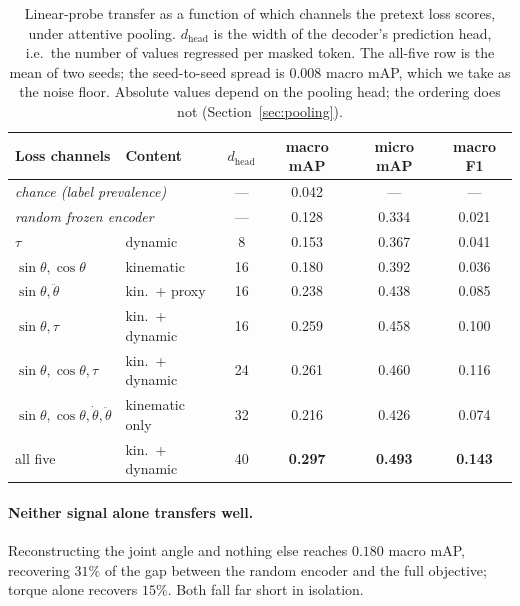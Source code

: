 \begin{table}[t]
\centering
\small
\begin{tabular}{llcccc}
\toprule
Loss channels & Content & $d_\text{head}$ & macro mAP & micro mAP & macro F1 \\
\midrule
\multicolumn{2}{l}{\emph{chance (label prevalence)}}   & --- & 0.042 & ---   & ---   \\
\multicolumn{2}{l}{\emph{random frozen encoder}}       & --- & 0.128 & 0.334 & 0.021 \\
\midrule
$\tau$                                        & dynamic          &  8 & 0.153 & 0.367 & 0.041 \\
$\sin\theta,\cos\theta$                       & kinematic        & 16 & 0.180 & 0.392 & 0.036 \\
$\sin\theta,\ddot\theta$                      & kin.\ + proxy    & 16 & 0.238 & 0.438 & 0.085 \\
$\sin\theta,\tau$                             & kin.\ + dynamic  & 16 & 0.259 & 0.458 & 0.100 \\
$\sin\theta,\cos\theta,\tau$                  & kin.\ + dynamic  & 24 & 0.261 & 0.460 & 0.116 \\
$\sin\theta,\cos\theta,\dot\theta,\ddot\theta$& kinematic only   & 32 & 0.216 & 0.426 & 0.074 \\
all five                                      & kin.\ + dynamic  & 40 & \textbf{0.297} & \textbf{0.493} & \textbf{0.143} \\
\bottomrule
\end{tabular}
\caption{Linear-probe transfer as a function of which channels the pretext loss scores,
under attentive pooling. $d_\text{head}$ is the width of the decoder's prediction head,
i.e.\ the number of values regressed per masked token. The all-five row is the mean of
two seeds; the seed-to-seed spread is $0.008$ macro mAP, which we take as the noise
floor. Absolute values depend on the pooling head; the ordering does not
(Section~\ref{sec:pooling}).}
\label{tab:channels}
\end{table}

\paragraph{Neither signal alone transfers well.} Reconstructing the joint angle and
nothing else reaches $0.180$ macro mAP, recovering $31\%$ of the gap between the random
encoder and the full objective; torque alone recovers $15\%$. Both fall far short in
isolation.

